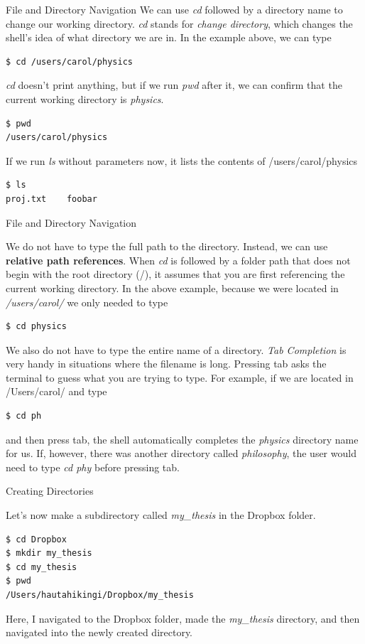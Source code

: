 \documentclass[10pt,leqno]{beamer}
\begin{document}
\begin{frame}[fragile]{File and Directory Navigation}
We can use \emph{cd} followed by a directory name to change our working directory. \emph{cd} stands for \emph{change directory}, which changes the shell's idea of what directory we are in. In the example above, we can type
\begin{lstlisting}
$ cd /users/carol/physics
\end{lstlisting}
\emph{cd} doesn't print anything, but if we run \emph{pwd} after it, we can confirm that the current working directory is \emph{physics}.
\begin{lstlisting}
$ pwd
/users/carol/physics
\end{lstlisting}
If we run \emph{ls} without parameters now, it lists the contents of /users/carol/physics
\begin{lstlisting}
$ ls
proj.txt 	foobar
\end{lstlisting}

\end{frame}

\begin{frame}[fragile]{File and Directory Navigation}

We do not have to type the full path to the directory.  Instead, we can use \textbf{relative path references}. When \emph{cd} is followed by a folder path that does not begin with the root directory (/), it assumes that you are first referencing the current working directory. In the above example, because we were located in \emph{/users/carol/} we only needed to type 
\begin{lstlisting}
$ cd physics
\end{lstlisting}
We also do not have to type the entire name of a directory. \emph{Tab Completion} is very handy in situations where the filename is long. Pressing tab asks the terminal to guess what you are trying to type. For example, if we are located in /Users/carol/ and type
\begin{lstlisting}
$ cd ph
\end{lstlisting}
and then press tab, the shell automatically completes the \emph{physics} directory name for us. If, however, there was another directory called \emph{philosophy}, the user would need to type \emph{cd phy} before pressing tab.

\end{frame}

\begin{frame}[fragile]{Creating Directories}

Let's now make a subdirectory called \emph{my\_thesis} in the Dropbox folder.
\begin{lstlisting}
$ cd Dropbox
$ mkdir my_thesis
$ cd my_thesis
$ pwd
/Users/hautahikingi/Dropbox/my_thesis
\end{lstlisting}
Here, I navigated to the Dropbox folder, made the \emph{my\_thesis} directory, and then navigated into the newly created directory. 
\end{frame}
\end{document}
